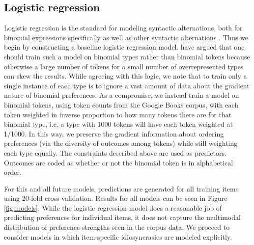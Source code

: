 \documentclass[10pt,letterpaper]{article}
\begin{document}
\subsection{Logistic regression}\label{logistic}
Logistic regression is the standard for modeling syntactic alternations, both for binomial expressions specifically \citep[e.g.][]{Benor:2006gv,Morgan:uMm0l0Ja} as well as other syntactic alternations \citep[e.g.][]{Bresnan:2007td,FlorianJaeger:2010hl}. Thus we begin by constructing a baseline logistic regression model. \citeauthor{Benor:2006gv} have argued that one should train such a model on binomial types rather than binomial tokens because otherwise a large number of tokens for a small number of overrepresented types can skew the results. While agreeing with this logic, we note that to train only a single instance of each type is to ignore a vast amount of data about the gradient nature of binomial preferences. As a compromise, we instead train a model on binomial tokens, using token counts from the Google Books corpus, with each token weighted in inverse proportion to how many tokens there are for that binomial type, i.e. a type with 1000 tokens will have each token weighted at 1/1000. In this way, we preserve the gradient information about ordering preferences (via the diversity of outcomes among tokens) while still weighting each type equally. The constraints described above are used as predictors. Outcomes are coded as whether or not the binomial token is in alphabetical order.

For this and all future models, predictions are generated for all training items using 20-fold cross validation. Results for all models can be seen in Figure \ref{fig:models}. While the logistic regression model does a reasonable job of predicting preferences for individual items, it does not capture the multimodal distribution of preference strengths seen in the corpus data. We proceed to consider models in which item-specific idiosyncrasies are modeled explicitly.
\end{document}
